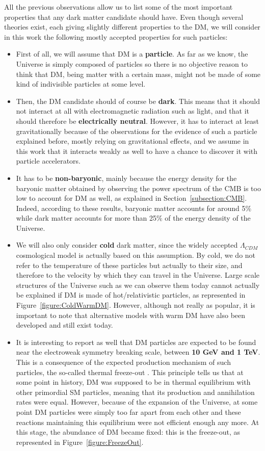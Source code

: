 \documentclass[a4paper, 10pt, openright]{report}
\begin{document}
All the previous observations allow us to list some of the most important properties that any dark matter candidate should have. Even though several theories exist, each giving slightly different properties to the \ac{DM}, we will consider in this work the following mostly accepted properties for such particles:
\begin{itemize}
\item First of all, we will assume that \ac{DM} is a \textbf{particle}. As far as we know, the Universe is simply composed of particles so there is no objective reason to think that \ac{DM}, being matter with a certain mass, might not be made of some kind of indivisible particles at some level.
\item Then, the \ac{DM} candidate should of course be \textbf{dark}. This means that it should not interact at all with electromagnetic radiation such as light, and that it should therefore be \textbf{electrically neutral}. However, it has to interact at least gravitationally because of the observations for the evidence of such a particle explained before, mostly relying on gravitational effects, and we assume in this work that it interacts weakly as well to have a chance to discover it with particle accelerators.
\item It has to be \textbf{non-baryonic}, mainly because the energy density for the baryonic matter obtained by observing the power spectrum of the \ac{CMB} is too low to account for \ac{DM} as well, as explained in Section~\ref{subsection:CMB}. Indeed, according to these results, baryonic matter accounts for around 5\% while dark matter accounts for more than 25\% of the energy density of the Universe. 
\item We will also only consider \textbf{cold} dark matter, since the widely accepted $\Lambda_{CDM}$ cosmological model is actually based on this assumption. By cold, we do not refer to the temperature of these particles but actually to their size, and therefore to the velocity by which they can travel in the Universe. Large scale structures of the Universe such as we can observe them today cannot actually be explained if \ac{DM} is made of hot/relativistic particles, as represented in Figure~\ref{figure:ColdWarmDM}. However, although not really as popular, it is important to note that alternative models with warm \ac{DM} have also been developed and still exist today.
\item It is interesting to report as well that \ac{DM} particles are expected to be found near the electroweak symmetry breaking scale, between \textbf{10 GeV and 1 TeV}. This is a consequence of the expected production mechanism of such particles, the so-called thermal freeze-out \cite{Freezeout1}. This principle tells us that at some point in history, \ac{DM} was supposed to be in thermal equilibrium with other primordial \ac{SM} particles, meaning that its production and annihilation rates were equal. However, because of the expansion of the Universe, at some point \ac{DM} particles were simply too far apart from each other and these reactions maintaining this equilibrium were not efficient enough any more. At this stage, the abundance of \ac{DM} became fixed: this is the freeze-out, as represented in Figure~\ref{figure:FreezeOut}.


\end{itemize}
\end{document}
